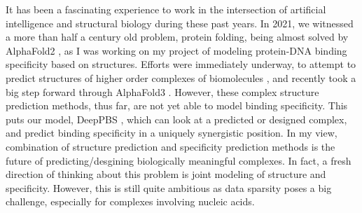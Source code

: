 
It has been a fascinating experience to work in the intersection of artificial intelligence and structural biology during these past years. In 2021, we witnessed a more than half a century old problem, protein folding, being almost solved by AlphaFold2 \citep{Jumper2021}, as I was working on my project of modeling protein-DNA binding specificity based on structures. Efforts were immediately underway, to attempt to predict structures of higher order complexes of biomolecules \citep{evans2021protein,baek2024na}, and recently took a big step forward through AlphaFold3 \citep{Abramson2024}. However, these complex structure prediction methods, thus far, are not yet able to model binding specificity. This puts our model, DeepPBS \citep{Mitra2024}, which can look at a predicted or designed complex, and predict binding specificity in a uniquely synergistic position. In my view, combination of structure prediction and specificity prediction methods is the future of predicting/desgining biologically meaningful complexes. In fact, a fresh direction of thinking about this problem is joint modeling of structure and specificity. However, this is still quite ambitious as data sparsity poses a big challenge, especially for complexes involving nucleic acids. 

